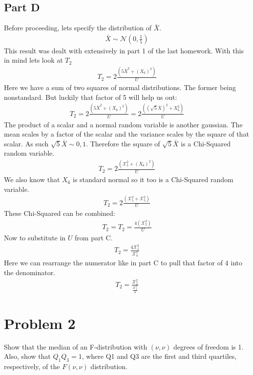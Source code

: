\documentclass{article}
\begin{document}
\subsection*{Part D}
Before proceeding, lets specify the distribution of $\bar{X}$.
\begin{align*}
\bar{X} \sim \mathcal{N}(0,\frac{1}{5})
\end{align*}
This result was dealt with extensively in part 1 of the last homework. With this in mind lets look at $T_2$
\begin{align*}
T_2 = 2\frac{(5\bar{X}^2+(X_6)^2)}{U}
\end{align*}
Here we have a sum of two squares of normal distributions. The former being nonstandard. But luckily that factor of 5 will help us out:
\begin{align*}
T_2 = 2\frac{(5\bar{X}^2+(X_6)^2)}{U} = 2\frac{((\sqrt{5}\bar{X})^2+X_6^2)}{U}
\end{align*}
The product of a scalar and a normal random variable is another gaussian. The mean scales by a factor of the scalar and the variance scales by the square of that scalar. As such $\sqrt{5}\bar{X} \sim \mathcal{0,1}$. Therefore the square of $\sqrt{5}\bar{X}$ is a Chi-Squared random variable.
\begin{align*}
T_2 = 2\frac{(\mathcal{X}^2_5+(X_6)^2)}{U}
\end{align*}
We also know that $X_6$ is standard normal so it too is a Chi-Squared random variable.
\begin{align*}
T_2 = 2\frac{(\mathcal{X}^2_5+\mathcal{X}^2_5)}{U}
\end{align*}
These Chi-Squared can be combined:
\begin{align*}
T_2 = T_2 = \frac{4(\mathcal{X}^2_5)}{U}
\end{align*}
Now to substitute in $U$ from part C.
\begin{align*}
\boxed { T_2 = \frac{4\mathcal{X}^2_5}{\mathcal{X}^2_4} }
\end{align*}
Here we can rearrange the numerator like in part C to pull that factor of 4 into the denominator.
\begin{align*}
\boxed { T_2 = \frac{\mathcal{X}^2_5}{\tfrac{\mathcal{X}^2_4}{4}} }
\end{align*}

\clearpage

\section*{Problem 2}
Show that the median of an F-distribution with $(\nu, \nu)$ degrees of freedom is 1. Also,
show that $Q_1Q_3 = 1$, where Q1 and Q3 are the first and third quartiles, respectively, of the $F(\nu,\nu)$
distribution.
\end{document}
